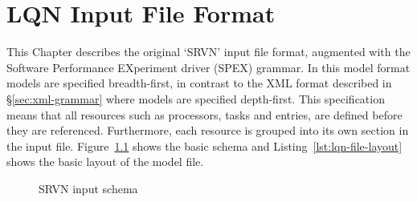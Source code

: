 \newcommand{\nonterminal}[1]{$<$\emph{#1}$>$\mbox{}}
\chapter{LQN Input File Format}
\label{ch:srvn}

This Chapter describes the original `SRVN' input file format, augmented with the Software Performance
EXperiment driver (SPEX) grammar.  In this model format models are specified breadth-first, in
contrast to the XML format described in \S\ref{sec:xml-grammar} where models are specified depth-first.
This specification means that all resources such as processors, tasks and entries, are defined before they
are referenced. Furthermore, each resource is grouped into its own section in the input file.
Figure~\ref{fig:srvn-schema} shows the basic schema and Listing~\ref{lst:lqn-file-layout} shows the basic
layout of the model file.

\begin{figure}[ht]
  \centering
  \caption{SRVN input schema}
  \label{fig:srvn-schema}
\end{figure}

